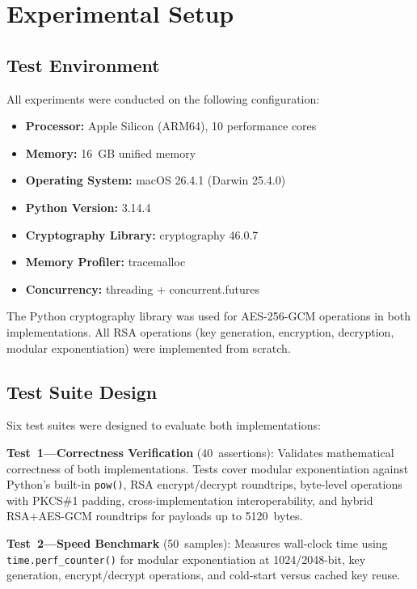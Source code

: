 \documentclass[journal]{IEEEtran}
\begin{document}
\section{Experimental Setup}
\label{sec:setup}

\subsection{Test Environment}

All experiments were conducted on the following configuration:

\begin{itemize}
    \item \textbf{Processor:} Apple Silicon (ARM64), 10 performance cores
    \item \textbf{Memory:} 16~GB unified memory
    \item \textbf{Operating System:} macOS 26.4.1 (Darwin 25.4.0)
    \item \textbf{Python Version:} 3.14.4
    \item \textbf{Cryptography Library:} cryptography 46.0.7~\cite{cryptography_io}
    \item \textbf{Memory Profiler:} tracemalloc~\cite{python_tracemalloc}
    \item \textbf{Concurrency:} threading + concurrent.futures~\cite{python_threading}
\end{itemize}

The Python cryptography library was used for AES-256-GCM operations in both implementations. All RSA operations (key generation, encryption, decryption, modular exponentiation) were implemented from scratch.

\subsection{Test Suite Design}

Six test suites were designed to evaluate both implementations:

\textbf{Test~1---Correctness Verification} (40~assertions): Validates mathematical correctness of both implementations. Tests cover modular exponentiation against Python's built-in \texttt{pow()}, RSA encrypt/decrypt roundtrips, byte-level operations with PKCS\#1 padding, cross-implementation interoperability, and hybrid RSA+AES-GCM roundtrips for payloads up to 5120~bytes.

\textbf{Test~2---Speed Benchmark} (50~samples): Measures wall-clock time using \texttt{time.perf\_counter()} for modular exponentiation at 1024/2048-bit, key generation, encrypt/decrypt operations, and cold-start versus cached key reuse.
\end{document}
